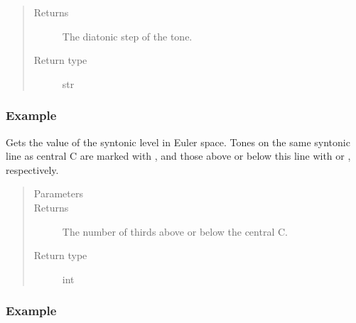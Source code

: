 \documentclass[letterpaper,10pt,english]{sphinxmanual}
\begin{document}
\begin{fulllineitems}
\begin{fulllineitems}
\begin{quote}
\begin{description}
\item[{Returns}] \leavevmode
The diatonic step of the tone.

\item[{Return type}] \leavevmode
str

\end{description}\end{quote}
\subsubsection*{Example}

\begin{sphinxVerbatim}[commandchars=\\\{\}]
   
\end{sphinxVerbatim}

\end{fulllineitems}


\begin{fulllineitems}
\label{\detokenize{api:musictheory.Tone.get_syntonic}}
Gets the value of the syntonic level in Euler space.
Tones on the same syntonic line as central C are marked with \sphinxtitleref{\_},
and those above or below this line with  or \sphinxtitleref{,}, respectively.
\begin{quote}\begin{description}
\item[{Parameters}] \leavevmode
{} \textendash{} 

\item[{Returns}] \leavevmode
The number of thirds above or below the central C.

\item[{Return type}] \leavevmode
int

\end{description}\end{quote}
\subsubsection*{Example}


\end{fulllineitems}
\end{fulllineitems}
\end{document}
